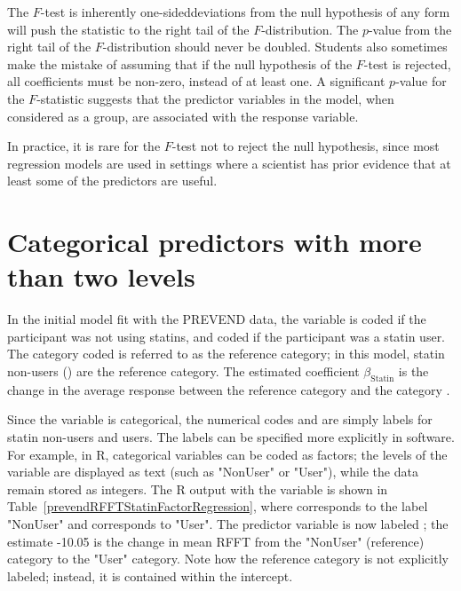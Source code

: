 The $F$-test is inherently one-sided\textemdash deviations from the null hypothesis of any form will push the statistic to the right tail of the $F$-distribution.  The $p$-value from the right tail of the $F$-distribution should never be doubled.  Students also sometimes make the mistake of assuming that if the null hypothesis of the $F$-test is rejected, all coefficients must be non-zero, instead of at least one. A significant $p$-value for the $F$-statistic suggests that the predictor variables in the model, when considered as a group, are associated with the response variable.

In practice, it is rare for the $F$-test not to reject the null hypothesis, since most regression models are used in settings where a scientist has prior evidence that at least some of the predictors are useful.

\section{Categorical predictors with more than two levels}
\label{categoricalMoreThanTwoLevels}

In the initial model fit with the PREVEND data, the variable  is coded  if the participant was not using statins, and coded  if the participant was a statin user. The category coded  is referred to as the reference category; in this model, statin non-users () are the reference category. The estimated coefficient $\beta_{\text{Statin}}$ is the change in the average response between the reference category and the category .

Since the variable  is categorical, the numerical codes  and  are simply labels for statin non-users and users. The labels can be specified more explicitly in software. For example, in \textsf{R}, categorical variables can be coded as factors; the levels of the variable are displayed as text (such as "NonUser" or "User"), while the data remain stored as integers. The \textsf{R} output with the variable  is shown in Table~\ref{prevendRFFTStatinFactorRegression}, where  corresponds to the label "NonUser" and  corresponds to "User". The predictor variable is now labeled ; the estimate -10.05 is the change in mean RFFT from the "NonUser" (reference) category to the "User" category. Note how the reference category is not explicitly labeled; instead, it is contained within the intercept. 

